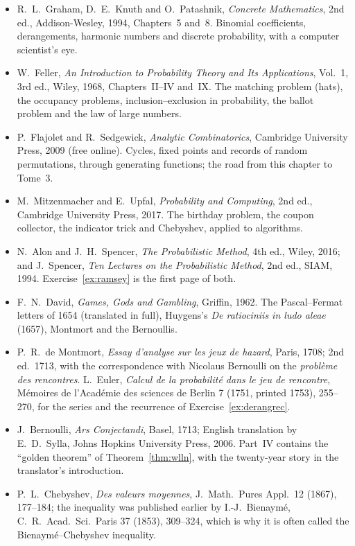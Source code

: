 \begin{itemize}
\item R.~L.~Graham, D.~E.~Knuth and O.~Patashnik, \emph{Concrete Mathematics}, 2nd ed., Addison-Wesley, 1994, Chapters~5 and~8. Binomial coefficients, derangements, harmonic numbers and discrete probability, with a computer scientist's eye.
\item W.~Feller, \emph{An Introduction to Probability Theory and Its Applications}, Vol.~1, 3rd ed., Wiley, 1968, Chapters~II--IV and~IX. The matching problem (hats), the occupancy problems, inclusion--exclusion in probability, the ballot problem and the law of large numbers.
\item P.~Flajolet and R.~Sedgewick, \emph{Analytic Combinatorics}, Cambridge University Press, 2009 (free online). Cycles, fixed points and records of random permutations, through generating functions; the road from this chapter to Tome~3.
\item M.~Mitzenmacher and E.~Upfal, \emph{Probability and Computing}, 2nd ed., Cambridge University Press, 2017. The birthday problem, the coupon collector, the indicator trick and Chebyshev, applied to algorithms.
\item N.~Alon and J.~H.~Spencer, \emph{The Probabilistic Method}, 4th ed., Wiley, 2016; and J.~Spencer, \emph{Ten Lectures on the Probabilistic Method}, 2nd ed., SIAM, 1994. Exercise~\ref{ex:ramsey} is the first page of both.
\item F.~N.~David, \emph{Games, Gods and Gambling}, Griffin, 1962. The Pascal--Fermat letters of 1654 (translated in full), Huygens's \emph{De ratiociniis in ludo aleae} (1657), Montmort and the Bernoullis.
\item P.~R.~de Montmort, \emph{Essay d'analyse sur les jeux de hazard}, Paris, 1708; 2nd ed.\ 1713, with the correspondence with Nicolaus Bernoulli on the \emph{probl\`eme des rencontres}. L.~Euler, \emph{Calcul de la probabilit\'e dans le jeu de rencontre}, M\'emoires de l'Acad\'emie des sciences de Berlin 7 (1751, printed 1753), 255--270, for the series and the recurrence of Exercise~\ref{ex:derangrec}.
\item J.~Bernoulli, \emph{Ars Conjectandi}, Basel, 1713; English translation by E.~D.~Sylla, Johns Hopkins University Press, 2006. Part~IV contains the ``golden theorem'' of Theorem~\ref{thm:wlln}, with the twenty-year story in the translator's introduction.
\item P.~L.~Chebyshev, \emph{Des valeurs moyennes}, J.\ Math.\ Pures Appl.\ 12 (1867), 177--184; the inequality was published earlier by I.-J.~Bienaym\'e, C.\ R.\ Acad.\ Sci.\ Paris 37 (1853), 309--324, which is why it is often called the Bienaym\'e--Chebyshev inequality.

\end{itemize}
